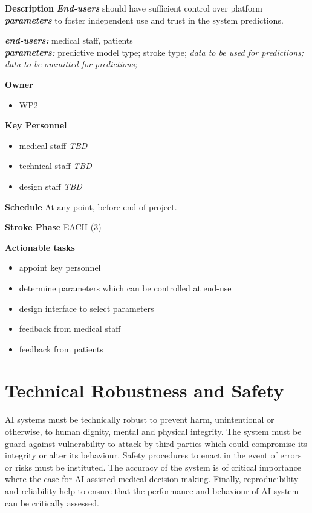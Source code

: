 \documentclass[
  letterpaper,
  DIV=11,
  numbers=noendperiod]{scrreport}
\providecommand{\tightlist}{%
  \setlength{\itemsep}{0pt}\setlength{\parskip}{0pt}}\usepackage{longtable,booktabs,array}
\begin{document}
\textbf{Description} \textbf{\emph{End-users}} should have sufficient
control over platform \textbf{\emph{parameters}} to foster independent
use and trust in the system predictions.

\textbf{\emph{end-users:}} medical staff, patients\\
\textbf{\emph{parameters:}} predictive model type; stroke type;
\emph{data to be used for predictions; data to be ommitted for
predictions;}

\textbf{Owner}

\begin{itemize}
\tightlist
\item
  WP2
\end{itemize}

\textbf{Key Personnel}

\begin{itemize}
\tightlist
\item
  medical staff \emph{TBD}
\item
  technical staff \emph{TBD}
\item
  design staff \emph{TBD}
\end{itemize}

\textbf{Schedule} At any point, before end of project.

\textbf{Stroke Phase} EACH (3)

\textbf{Actionable tasks}

\begin{itemize}
\tightlist
\item
  appoint key personnel
\item
  determine parameters which can be controlled at end-use
\item
  design interface to select parameters
\item
  feedback from medical staff
\item
  feedback from patients
\end{itemize}


\hypertarget{technical-robustness-and-safety}{%
\chapter{Technical Robustness and
Safety}\label{technical-robustness-and-safety}}

AI systems must be technically robust to prevent harm, unintentional or
otherwise, to human dignity, mental and physical integrity. The system
must be guard against vulnerability to attack by third parties which
could compromise its integrity or alter its behaviour. Safety procedures
to enact in the event of errors or risks must be instituted. The
accuracy of the system is of critical importance where the case for
AI-assisted medical decision-making. Finally, reproducibility and
reliability help to ensure that the performance and behaviour of AI
system can be critically assessed.
\end{document}
